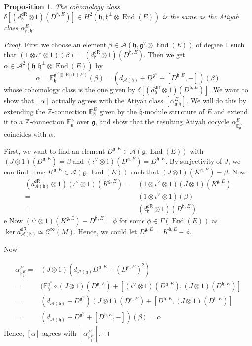 \documentclass[12pt]{amsart}
\newtheorem{prop}[thm]{Proposition}
\theoremstyle{definition}
\theoremstyle{remark}
\numberwithin{equation}{section}
\newcommand{\CA}{{\mathcal A}}
\newcommand{\cinf}{{\mathcal C}^{\infty}}
\newcommand{\Z}{{\mathbb{Z}}}
\newcommand{\1}{{\mathbb{1}}}
\newcommand{\g}{\mathfrak{g}}
\newcommand{\h}{\mathfrak{h}}
\newcommand{\dr}{\mathsf{dR}}
\newcommand{\End}{\operatorname{End}}
\begin{document}
\begin{prop}
    The cohomology class $\delta[(d^{\dr}_{\h} \otimes 1)(D^{\h, E})] \in H^2(\h,\h^{\perp}\otimes \underline{\End}(E))$ is the same as the Atiyah class $\alpha^E_{\g, \h}$.
\end{prop}
\begin{proof}
     First we choose an element $\beta \in \CA(\h, \g^{\vee}\otimes \underline{\End}(E))$ of degree 1 such that $(1\otimes \iota^{\vee} \otimes 1)(\beta) = (d^{\dr}_{\h} \otimes 1)(D^{\h, E})$. Then we get $\alpha \in \CA^2(\h, \h^{\perp} \otimes \underline{\End}(E))$ by
     \begin{equation*}
         \alpha = \mathbb{E}_{\h}^{\g^{\vee}\otimes \underline{\End}(E)}(\beta) = (d_{\CA(\h)} + D^{\g^{\vee}}+[D^{\h, E}, -])(\beta)
     \end{equation*}
     whose cohomology class is the one given by $\delta[(d^{\dr}_{\h} \otimes 1)(D^{\h, E})]$. We want to show that $[\alpha]$ actually agrees with the Atiyah class $[\alpha^E_{\g, \h}]$. We will do this by extending the $\Z$-connection $\mathbb{E}_{\h}^E$ given by the $\h$-module structure of $E$ and extend it to a $\Z$-connection $\mathbb{E}^E_{\g}$ over $\g$, and show that the resulting Atiyah cocycle $\alpha^E_{\mathbb{E}^E_{\g}}$ coincides with $\alpha$.
     
     First, we want to find an element $D^{\g, E} \in \CA(\g, \underline{\End}(E))$ with $(J\otimes 1)(D^{\g, E}) = \beta$ and $(\iota^{\vee} \otimes 1)(D^{\g, E}) = D^{\h, E}$. By surjectivity of $J$, we can find some   $K^{\g, E} \in \CA(\g, \underline{\End}(E))$ such that $(J\otimes 1)(K^{\g, E}) = \beta$. Now 
     \begin{align*}
         (d^{\dr}_{\CA(\h)}\otimes 1)(\iota^{\vee} \otimes 1)(K^{\g, E}) =& (1\otimes \iota^{\vee} \otimes 1)(J\otimes 1)(K^{\g, E})\\
         =&(1\otimes \iota^{\vee} \otimes 1)(\beta)\\
         =&(d^{\dr}_{\h} \otimes 1)(D^{\h, E})
     \end{align*}
e     Now $(\iota^{\vee} \otimes 1)(K^{\g, E}) - D^{\h, E} = \phi$ for some $\phi \in \Gamma(\underline{\End}(E))$ as $\ker d^{\dr}_{\CA(\h)} \simeq \cinf(M)$. Hence, we could let $D^{\g, E} = K^{\h, E} - \phi$.

Now 

\begin{align*}
    \alpha^E_{\mathbb{E}^E_{\g}} =& (J\otimes 1)(d_{\CA(\g)}D^{\g, E} +(D^{\g, E})^2)\\
    =& (\mathbb{E}_{\h}^{\g^{\vee}}\circ (J\otimes 1) (D^{\g, E}) + [(\iota^{\vee}\otimes 1)(D^{\g, E}),(J\otimes 1) (D^{\h, E})]\\
    =& (d_{\CA(\h)} + D^{\g^{\vee}})(J\otimes 1) (D^{\g, E}) +[D^{\h, E},(J\otimes 1) (D^{\h, E})]\\
    =& (d_{\CA(\h)} + D^{\g^{\vee}}+[D^{\h, E}, -])(\beta)=\alpha
\end{align*}
Hence, $[\alpha]$ agrees with $[\alpha^E_{\mathbb{E}^E_{\g}}]$.
\end{proof}
\end{document}
